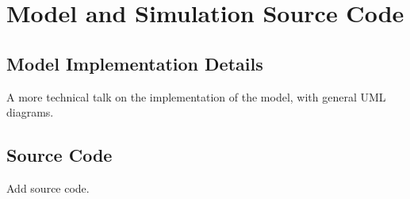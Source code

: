 \chapter{Model and Simulation Source Code}

\section{Model Implementation Details}

A more technical talk on the implementation of the model, with general UML diagrams.

\section{Source Code}

Add source code.